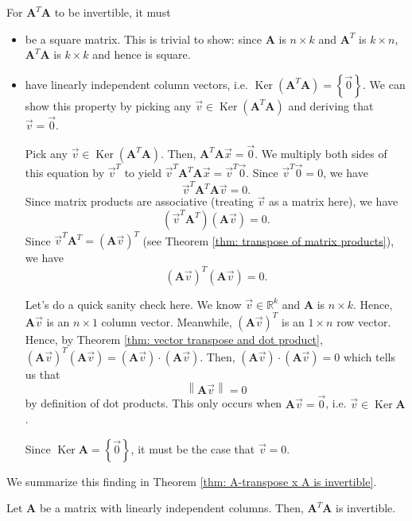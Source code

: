 \documentclass[]{book}
\DeclareMathOperator{\kernel}{Ker}
\newcommand{\mat}[1]{\ensuremath{\mathbf{#1}}}
\newcommand{\R}{\ensuremath{\mathbb{R}}}
\begin{document}
For $\mat{A}^T\mat{A}$ to be invertible, it must
\begin{itemize}
    \item be a square matrix. This is trivial to show: since $\mat{A}$ is $n \times k$ and $\mat{A}^T$ is $k \times n$, $\mat{A}^T\mat{A}$ is $k \times k$ and hence is square.
    \item have linearly independent column vectors, i.e. $\kernel\left(\mat{A}^T\mat{A}\right) = \left\{\vec{0}\right\}$. We can show this property by picking any $\vec{v} \in \kernel\left(\mat{A}^T\mat{A}\right)$ and deriving that $\vec{v} = \vec{0}$. 
    
    Pick any $\vec{v} \in \kernel\left(\mat{A}^T\mat{A}\right)$. Then, $\mat{A}^T\mat{A}\vec{x} = \vec{0}$. We multiply both sides of this equation by $\vec{v}^T$ to yield $\vec{v}^T\mat{A}^T\mat{A}\vec{x} = \vec{v}^T\vec{0}$. Since $\vec{v}^T\vec{0} = 0$, we have \[\vec{v}^T\mat{A}^T\mat{A}\vec{v} = 0.\]
    Since matrix products are associative (treating $\vec{v}$ as a matrix here), we have
    \[\left(\vec{v}^T\mat{A}^T\right)\left(\mat{A}\vec{v}\right) = 0.\]
    Since $\vec{v}^T\mat{A}^T = \left(\mat{A}\vec{v}\right)^T$ (see Theorem \ref{thm: transpose of matrix products}), we have
    \[\left(\mat{A}\vec{v}\right)^T\left(\mat{A}\vec{v}\right)=0.\]
    
    Let's do a quick sanity check here. We know $\vec{v} \in \R^k$ and $\mat{A}$ is $n \times k$. Hence, $\mat{A}\vec{v}$ is an $n \times 1$ column vector. Meanwhile, $\left(\mat{A}\vec{v}\right)^T$ is an $1 \times n$ row vector. Hence, by Theorem \ref{thm: vector transpose and dot product}, $\left(\mat{A}\vec{v}\right)^T\left(\mat{A}\vec{v}\right) = \left(\mat{A}\vec{v}\right)\cdot\left(\mat{A}\vec{v}\right)$. Then,
    $\left(\mat{A}\vec{v}\right)\cdot\left(\mat{A}\vec{v}\right) = 0$
    which tells us that \[\left\|\mat{A}\vec{v}\right\| = 0\] by definition of dot products. This only occurs when $\mat{A}\vec{v} = \vec{0}$, i.e. $\vec{v} \in \kernel\mat{A}$. 
    
    Since $\kernel\mat{A}=\left\{\vec{0}\right\}$, it must be the case that $\vec{v} = 0$.
\end{itemize}

We summarize this finding in Theorem \ref{thm: A-transpose x A is invertible}.
\begin{theorem}[$\mat{A}^T\mat{A}$ is invertible]
    \label{thm: A-transpose x A is invertible}
    Let $\mat{A}$ be a matrix with linearly independent columns. Then,
    $\mat{A}^T\mat{A}$ is invertible.
\end{theorem}
\end{document}
